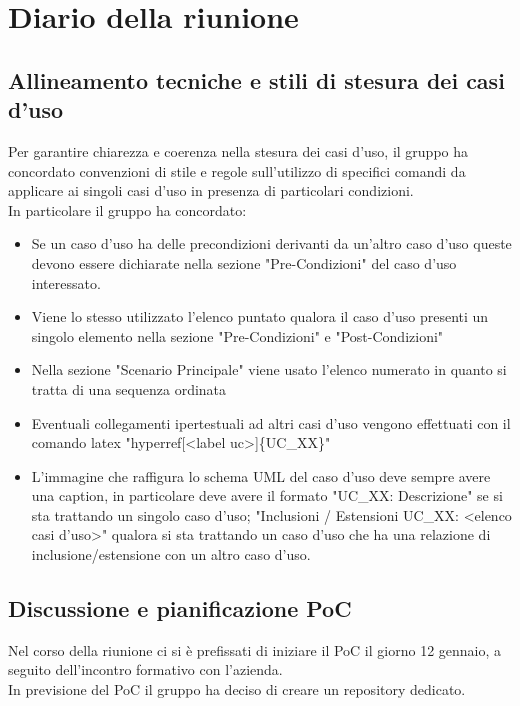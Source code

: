 \section{Diario della riunione}
\subsection{Allineamento tecniche e stili di stesura dei casi d'uso}
Per garantire chiarezza e coerenza nella stesura dei casi d'uso, il gruppo ha concordato convenzioni di stile e regole sull'utilizzo di specifici comandi da applicare ai singoli casi d'uso in presenza di particolari condizioni.\\
In particolare il gruppo ha concordato:
\begin{itemize}
    \item Se un caso d'uso ha delle precondizioni derivanti da un'altro caso d'uso queste devono essere dichiarate nella sezione "Pre-Condizioni" del caso d'uso interessato.
    \item Viene lo stesso utilizzato l'elenco puntato qualora il caso d'uso presenti un singolo elemento nella sezione "Pre-Condizioni" e "Post-Condizioni"
    \item Nella sezione "Scenario Principale" viene usato l'elenco numerato in quanto si tratta di una sequenza ordinata
    \item Eventuali collegamenti ipertestuali ad altri casi d'uso vengono effettuati con il comando latex "hyperref[<label uc>]\{UC\_XX\}"
    \item L'immagine che raffigura lo schema UML del caso d'uso deve sempre avere una caption, in particolare deve avere il formato "UC\_XX: Descrizione" se si sta trattando un singolo caso d'uso; "Inclusioni / Estensioni UC\_XX: <elenco casi d'uso>" qualora si sta trattando un caso d'uso che ha una relazione di inclusione/estensione con un altro caso d'uso.
\end{itemize}

\subsection{Discussione e pianificazione PoC}
Nel corso della riunione ci si è prefissati di iniziare il PoC il giorno 12 gennaio, a seguito dell'incontro formativo con l'azienda.\\
In previsione del PoC il gruppo ha deciso di creare un repository dedicato.

